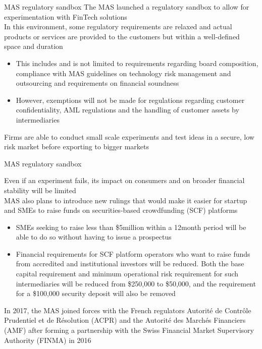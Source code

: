 \documentclass[11pt]{beamer}
\begin{document}

\begin{frame}{MAS regulatory sandbox}
	The MAS launched a regulatory sandbox to allow for experimentation with FinTech solutions \\ \vspace{3mm}
	In this environment, some regulatory requirements are relaxed and actual products or services are provided to the customers but within a well-defined space and duration
	\begin{itemize}
		\item This includes and is not limited to requirements regarding board composition, compliance with MAS guidelines on technology risk management and outsourcing and requirements on financial soundness
		\item However, exemptions will not be made for regulations regarding customer confidentiality, AML regulations and the handling of customer assets by intermediaries
	\end{itemize}
	Firms are able to conduct small scale experiments and test ideas in a secure, low risk market before exporting to bigger markets
\end{frame}


\begin{frame}{MAS regulatory sandbox}
	\begin{small}
		Even if an experiment fails, its impact on consumers and on broader financial stability will be limited\\ \vspace{3mm}
		MAS also plans to introduce new rulings that would make it easier for startup and SMEs to raise funds on securities-based crowdfunding (SCF) platforms
		\begin{itemize}
			\item SMEs seeking to raise less than \$5million within a 12month period will be able to do so without having to issue a prospectus
			\item Financial requirements for SCF platform operators who want to raise funds from accredited and institutional investors will be reduced. Both the base capital requirement and minimum operational risk requirement for such intermediaries will be reduced from \$250,000 to \$50,000, and the requirement for a \$100,000 security deposit will also be removed
		\end{itemize}
		In 2017, the MAS joined forces with the French regulators Autorit\'{e} de Contr\^{o}le Prudentiel et de R\'{e}solution (ACPR) and the Autorit\'{e} des March\'{e}s Financiers (AMF) after forming a partnership with the Swiss Financial Market Supervisory Authority (FINMA) in 2016
	\end{small}
\end{frame}
\end{document}
